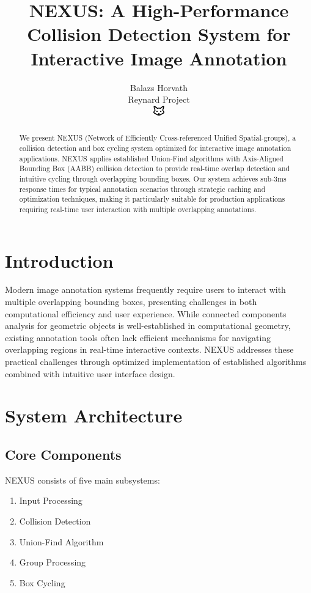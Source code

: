 \documentclass[10pt]{article}
\begin{document}
\title{NEXUS: A High-Performance Collision Detection System for Interactive Image Annotation}

\author{Balazs Horvath\\
Reynard Project\\
\includegraphics[width=0.5cm]{../../shared-assets/favicon.pdf}}

\maketitle

\begin{abstract}
We present NEXUS (Network of Efficiently Cross-referenced Unified Spatial-groups), a collision detection and box cycling system optimized for interactive image annotation applications. NEXUS applies established Union-Find algorithms with Axis-Aligned Bounding Box (AABB) collision detection to provide real-time overlap detection and intuitive cycling through overlapping bounding boxes. Our system achieves sub-3ms response times for typical annotation scenarios through strategic caching and optimization techniques, making it particularly suitable for production applications requiring real-time user interaction with multiple overlapping annotations.
\end{abstract}

\section{Introduction}
Modern image annotation systems frequently require users to interact with multiple overlapping bounding boxes, presenting challenges in both computational efficiency and user experience. While connected components analysis for geometric objects is well-established in computational geometry, existing annotation tools often lack efficient mechanisms for navigating overlapping regions in real-time interactive contexts. NEXUS addresses these practical challenges through optimized implementation of established algorithms combined with intuitive user interface design.

\section{System Architecture}
\subsection{Core Components}
NEXUS consists of five main subsystems:
\begin{enumerate}
    \item Input Processing
    \item Collision Detection
    \item Union-Find Algorithm
    \item Group Processing
    \item Box Cycling
\end{enumerate}
\end{document}
